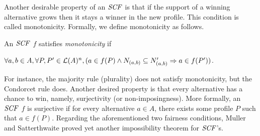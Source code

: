 %
%
%
%

Another desirable property of an $\it{SCF}$ is that if the support of a winning
alternative grows then it stays a winner in the new profile.
This condition is called monotonicity. Formally, we define monotonicity as follows.

\begin{definition}
	An $\it{SCF}$ $f$ satisfies \textit{monotonicity} if 
	\begin{center}
		$\forall a,b \in A, \forall P,P' \in \mathcal{L}(A)^n, (a \in f(P) \wedge 
		N_{(a,b)} \subseteq N'_{(a,b)} \Rightarrow a \in f(P'))$.
	\end{center}
\end{definition}

For instance, the majority rule (plurality) does not satisfy monotonicity, but 
the Condorcet rule does.  Another desired property is that every alternative
has a chance to win, namely, surjectivity (or non-imposingness).  More formally, 
an $\it{SCF}$ $f$ is surjective if for every alternative $a \in A$, there exists
some profile $P$ such that $a \in f(P)$.
Regarding the aforementioned two fairness conditions, Muller and Satterthwaite \cite{Mull_Satt}
proved yet another impossibility theorem for $\it{SCF}$'s.

